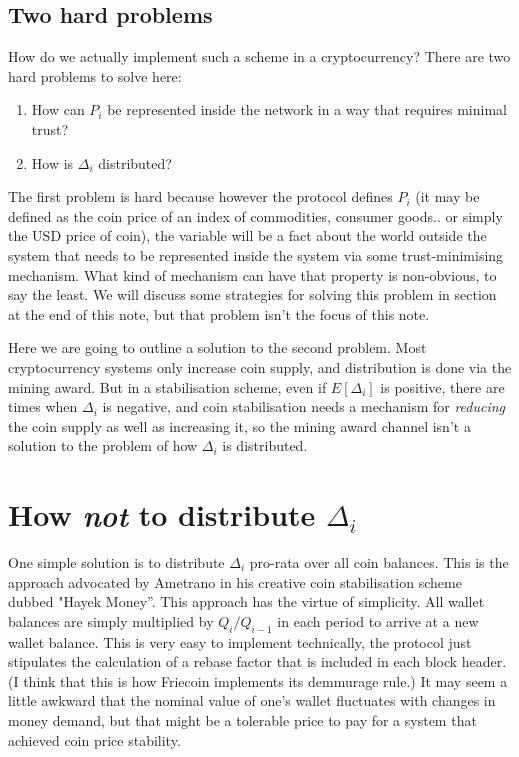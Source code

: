 \documentclass[twocolumn]{article}
\begin{document}
\subsection*{Two hard problems}
How do we actually implement such a scheme in a cryptocurrency? There
are two hard problems to solve here:
\begin{enumerate}
\item How can $P_{i}$ be represented inside the network in a way that
  requires minimal trust?
\item How is $\Delta_{i}$ distributed? 
\end{enumerate}
The first problem is hard because however the protocol defines $P_{i}$
(it may be defined as the coin price of an index of commodities,
consumer goods.. or simply the USD price of coin), the variable will
be a fact about the world outside the system that needs to be
represented inside the system via some trust-minimising
mechanism. What kind of mechanism can have that property is
non-obvious, to say the least. We will discuss some strategies for
solving this problem in section at the end of this note, but that
problem isn't the focus of this note.

Here we are going to outline a solution to the second problem. Most
cryptocurrency systems only increase coin supply, and distribution is
done via the mining award. But in a stabilisation scheme, even if
$E[\Delta_{i}]$ is positive, there are times when $\Delta_{i}$ is
negative, and coin stabilisation needs a mechanism for \emph{reducing}
the coin supply as well as increasing it, so the mining award channel
isn't a solution to the problem of how $\Delta_{i}$ is distributed.

\section*{How \emph{not} to distribute $\Delta_{i}$}
One simple solution is to distribute $\Delta_{i}$ pro-rata over all
coin balances. This is the approach advocated by Ametrano in his
creative coin stabilisation scheme dubbed "Hayek
Money''\cite{ametrano}. This approach has the virtue of
simplicity. All wallet balances are simply multiplied by $Q_{i} /
Q_{i-1}$ in each period to arrive at a new wallet balance. This is
very easy to implement technically, the protocol just stipulates the
calculation of a rebase factor that is included in each block
header. (I think that this is how Friecoin implements its demmurage
rule.) It may seem a little awkward that the nominal value of one's
wallet fluctuates with changes in money demand, but that might be a
tolerable price to pay for a system that achieved coin price stability.
\end{document}
